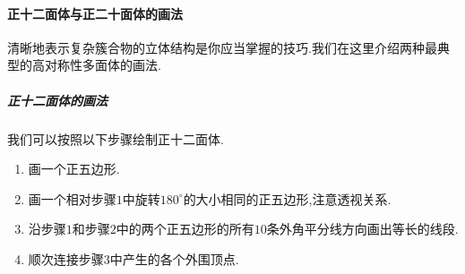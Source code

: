 \documentclass{ctexart}
\begin{document}
\paragraph{正十二面体与正二十面体的画法}
清晰地表示复杂簇合物的立体结构是你应当掌握的技巧.我们在这里介绍两种最典型的高对称性多面体的画法.
\subparagraph{正十二面体的画法}
我们可以按照以下步骤绘制正十二面体.
\begin{enumerate}[label=$\mathit{Step\ \arabic*.}$,topsep=0pt,parsep=0pt,itemsep=0pt,partopsep=0pt,leftmargin=*]
    \item 画一个正五边形.
    \item 画一个相对步骤$\mathit{1}$中旋转$180^\circ$的大小相同的正五边形,注意透视关系.
    \item 沿步骤$\mathit{1}$和步骤$\mathit{2}$中的两个正五边形的所有$10$条外角平分线方向画出等长的线段.
    \item 顺次连接步骤$\mathit{3}$中产生的各个外围顶点.
\end{enumerate}
\end{document}
